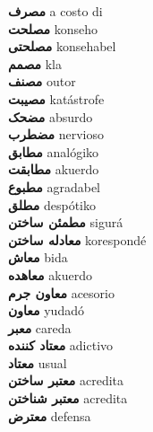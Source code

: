 \textbf{ مصرف  } a costo di \\
\textbf{ مصلحت  } konseho \\
\textbf{ مصلحتی  } konsehabel \\
\textbf{ مصمم  } kla \\
\textbf{ مصنف  } outor \\
\textbf{ مصیبت  } katástrofe \\
\textbf{ مضحک  } absurdo \\
\textbf{ مضطرب  } nervioso \\
\textbf{ مطابق  } analógiko \\
\textbf{ مطابقت  } akuerdo \\
\textbf{ مطبوع  } agradabel \\
\textbf{ مطلق  } despótiko \\
\textbf{ مطمئن ساختن  } sigurá \\
\textbf{ معادله ساختن  } korespondé \\
\textbf{ معاش  } bida \\
\textbf{ معاهده  } akuerdo \\
\textbf{ معاون جرم  } acesorio \\
\textbf{ معاون  } yudadó \\
\textbf{ معبر  } careda \\
\textbf{ معتاد کننده  } adictivo \\
\textbf{ معتاد  } usual \\
\textbf{ معتبر ساختن  } acredita \\
\textbf{ معتبر شناختن  } acredita \\
\textbf{ معترض  } defensa \\
